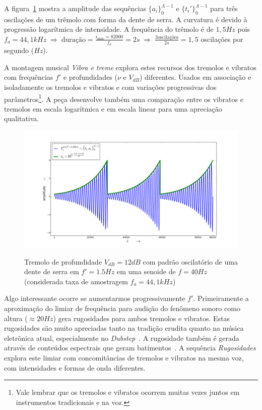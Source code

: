 A figura~\ref{fig:tremolo} mostra a amplitude das sequências $\{a_i\}_0^{\Lambda-1}$ e $\{t_i'\}_0^{\Lambda-1}$
para três oscilações de um trêmolo com forma da dente de serra. A curvatura é devido à progressão logarítmica de
intensidade. A frequência do trêmolo é de $1,5Hz$ pois $f_a=44,1kHz \; \Rightarrow \; \text{duração} = \frac{i_{\text{máx}}=82000}{f_a}= 2s \; \Rightarrow \; \frac{3\text{oscilações}}{2s}=1,5$ oscilações por segundo ($Hz$). 

A montagem musical \emph{Vibra e treme} explora estes recursos dos tremolos e vibratos
com frequências $f'$
e profundidades ($\nu$ e $V_{dB}$) diferentes. Usados em associação e isoladamente os tremolos e vibratos e com variações progressivas dos parâmetros\footnote{Vale lembrar que os tremolos e vibratos ocorrem muitas vezes juntos em instrumentos tradicionais e na voz.}. A peça desenvolve também uma comparação entre os vibratos e tremolos em escala logarítmica e em escala linear para uma apreciação qualitativa.


\begin{figure}[h!]
    \centering
    \caption{Tremolo de profundidade $V_{dB}=12dB$ com padrão oscilatório de uma dente de serra em $f'=1.5Hz$ em uma senoide de $f=40Hz$ (considerada taxa de amostragem $f_a=44,1kHz$)}
        \includegraphics[width=\textwidth]{figuras/tremolo}
        \label{fig:tremolo}
\end{figure}

Algo interessante ocorre se aumentarmos progressivamente $f'$.
Primeiramente a aproximação do limiar de frequência
para audição do fenômeno sonoro como
altura ($\approx 20Hz$) gera rugosidades para
ambos tremolos e vibratos. Estas rugosidades são muito apreciadas
tanto na tradição erudita quanto na música eletrônica atual, especialmente no \emph{Dubstep}~\cite{DubRugoso}.
A rugosidade também é gerada através de conteúdos espectrais que geram batimentos~\cite{Porres}.  A sequência \emph{Rugosidades}
explora este limiar com concomitâncias de tremolos e vibratos na mesma
voz, com intensidades e formas de onda diferentes.

